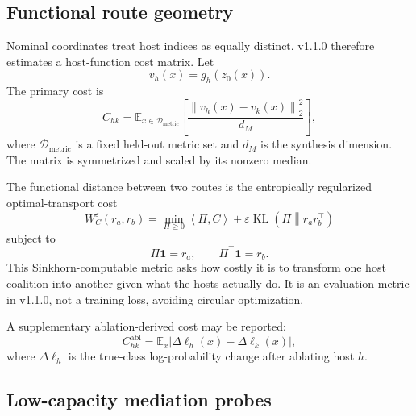 \documentclass[11pt,a4paper]{article}
\newcommand{\E}{\mathbb{E}}
\newcommand{\norm}[1]{\left\lVert #1 \right\rVert}
\newcommand{\KL}{\operatorname{KL}}
\begin{document}
\subsection{Functional route geometry}

Nominal coordinates treat host indices as equally distinct. v1.1.0 therefore estimates a host-function cost matrix. Let
\begin{equation}
 v_h(x)=g_h(z_0(x)).
\end{equation}
The primary cost is
\begin{equation}
 C_{hk}=\E_{x\in\mathcal{D}_{\mathrm{metric}}}
 \left[
 \frac{\norm{v_h(x)-v_k(x)}_2^2}{d_M}
 \right],
\end{equation}
where $\mathcal{D}_{\mathrm{metric}}$ is a fixed held-out metric set and $d_M$ is the synthesis dimension. The matrix is symmetrized and scaled by its nonzero median.

The functional distance between two routes is the entropically regularized optimal-transport cost
\begin{equation}
 W_C^\varepsilon(r_a,r_b)=
 \min_{\Pi\geq0}
 \left\langle \Pi,C\right\rangle
 +\varepsilon\KL\!\left(\Pi\middle\|r_ar_b^\top\right)
\end{equation}
subject to
\begin{equation}
 \Pi\mathbf{1}=r_a,
 \qquad
 \Pi^\top\mathbf{1}=r_b.
\end{equation}
This Sinkhorn-computable metric asks how costly it is to transform one host coalition into another given what the hosts actually do. It is an evaluation metric in v1.1.0, not a training loss, avoiding circular optimization.

A supplementary ablation-derived cost may be reported:
\begin{equation}
 C^{\mathrm{abl}}_{hk}=\E_x
 \left|\Delta\ell_h(x)-\Delta\ell_k(x)\right|,
\end{equation}
where $\Delta\ell_h$ is the true-class log-probability change after ablating host $h$.

\subsection{Low-capacity mediation probes}
\end{document}
